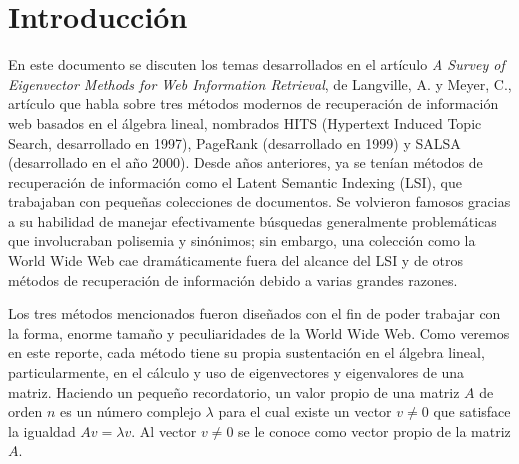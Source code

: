 \documentclass[11pt]{article}
\begin{document}
\section{Introducción} 
En este documento se discuten los temas desarrollados en el artículo \textit{A Survey of Eigenvector Methods for Web Information Retrieval}, de Langville, A. y Meyer, C., artículo que habla sobre tres métodos modernos de recuperación de información web basados en el álgebra lineal, nombrados HITS (Hypertext Induced Topic Search, desarrollado en 1997), PageRank (desarrollado en 1999) y SALSA (desarrollado en el año 2000). Desde años anteriores, ya se tenían métodos de recuperación de información como el Latent Semantic Indexing (LSI), que trabajaban con pequeñas colecciones de documentos. Se volvieron famosos gracias a su habilidad de manejar efectivamente búsquedas generalmente problemáticas que involucraban polisemia y sinónimos; sin embargo, una colección como la World Wide Web cae dramáticamente fuera del alcance del LSI y de otros métodos de recuperación de información debido a varias grandes razones. \par \vspace{0.3cm}
Los tres métodos mencionados fueron diseñados con el fin de poder trabajar con la forma, enorme tamaño y peculiaridades de la World Wide Web. Como veremos en este reporte, cada método tiene su propia sustentación en el álgebra lineal, particularmente, en el cálculo y uso de eigenvectores y eigenvalores de una matriz. Haciendo un pequeño recordatorio, un valor propio de una matriz $A$ de orden $n$ es un número complejo $\lambda$ para el cual existe un vector $v\neq 0$ que satisface la igualdad $Av=\lambda v$. Al vector $v\neq 0$ se le conoce como vector propio de la matriz $A$.
\end{document}
